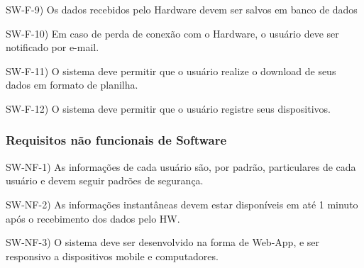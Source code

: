 SW-F-9) Os dados recebidos pelo Hardware devem ser salvos em banco de dados

SW-F-10) Em caso de perda de conexão com o Hardware, o usuário deve ser notificado por e-mail.

SW-F-11) O sistema deve permitir que o usuário realize o download de seus dados em formato de planilha.

SW-F-12) O sistema deve permitir que o usuário registre seus dispositivos.


\subsubsection{Requisitos não funcionais de Software}

SW-NF-1) As informações de cada usuário são, por padrão, particulares de cada usuário e devem seguir padrões de segurança.

SW-NF-2) As informações instantâneas devem estar disponíveis em até 1 minuto após o recebimento dos dados pelo HW.

SW-NF-3) O sistema deve ser desenvolvido na forma de Web-App, e ser responsivo a dispositivos mobile e computadores.

